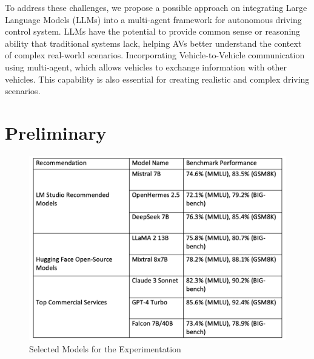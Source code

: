 \documentclass[conference]{IEEEtran}
\begin{document}
To address these challenges, we propose a possible approach on integrating Large Language Models (LLMs) into a multi-agent framework for autonomous driving control system. LLMs have the potential to provide common sense or reasoning ability that traditional systems lack, helping AVs better understand the context of complex real-world scenarios. Incorporating Vehicle-to-Vehicle communication using multi-agent, which allows vehicles to exchange information with other vehicles. This capability is also essential for creating realistic and complex driving scenarios.

\section{Preliminary}
\begin{figure}[h]
    \centering
\includegraphics[width=\linewidth]{Fig/Selected_LLM.png}
    \caption{Selected Models for the Experimentation}
    \label{fig:enter-label}
\end{figure}
\end{document}
